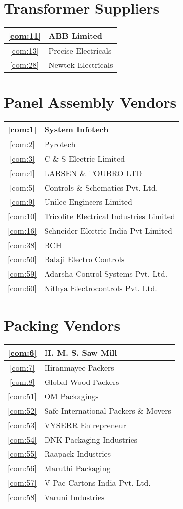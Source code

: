 \documentclass[a4paper, 11pt, twoside]{book}
\begin{document}
\section{Transformer Suppliers}\label{cat:5}
\begin{tabular}{|c|l|}
\hline
\ref{com:11} & ABB Limited \\ \hline
\ref{com:13} & Precise Electricals \\ \hline
\ref{com:28} & Newtek Electricals \\ \hline
\end{tabular}
\section{Panel Assembly Vendors}\label{cat:6}
\begin{tabular}{|c|l|}
\hline
\ref{com:1} & System Infotech \\ \hline
\ref{com:2} & Pyrotech \\ \hline
\ref{com:3} & C \& S Electric Limited \\ \hline
\ref{com:4} & LARSEN \& TOUBRO LTD \\ \hline
\ref{com:5} & Controls \& Schematics Pvt. Ltd. \\ \hline
\ref{com:9} & Unilec Engineers Limited \\ \hline
\ref{com:10} & Tricolite Electrical Industries Limited \\ \hline
\ref{com:16} & Schneider Electric India Pvt Limited \\ \hline
\ref{com:38} & BCH \\ \hline
\ref{com:50} & Balaji Electro Controls \\ \hline
\ref{com:59} & Adarsha Control Systems Pvt. Ltd. \\ \hline
\ref{com:60} & Nithya Electrocontrols Pvt. Ltd. \\ \hline
\end{tabular}
\section{Packing Vendors}\label{cat:7}
\begin{tabular}{|c|l|}
\hline
\ref{com:6} & H. M. S. Saw Mill \\ \hline
\ref{com:7} & Hiranmayee Packers \\ \hline
\ref{com:8} & Global Wood Packers \\ \hline
\ref{com:51} & OM Packagings \\ \hline
\ref{com:52} & Safe International Packers \& Movers \\ \hline
\ref{com:53} & VYSERR Entrepreneur \\ \hline
\ref{com:54} & DNK Packaging Industries \\ \hline
\ref{com:55} & Raapack Industries \\ \hline
\ref{com:56} & Maruthi Packaging \\ \hline
\ref{com:57} & V Pac Cartons India Pvt. Ltd. \\ \hline
\ref{com:58} & Varuni Industries \\ \hline
\end{tabular}
\end{document}
